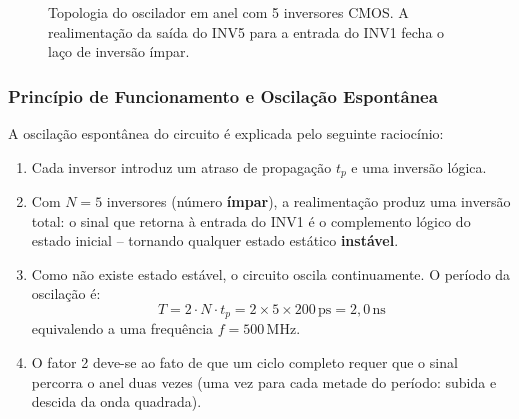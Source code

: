 \documentclass[12pt,a4paper]{article}
\begin{document}
\begin{figure}[H]
  \centering
  \caption{Topologia do oscilador em anel com 5 inversores CMOS. A realimentação
           da saída do INV5 para a entrada do INV1 fecha o laço de inversão ímpar.}
  \label{fig:ring_topo}
\end{figure}

\subsubsection{Princípio de Funcionamento e Oscilação Espontânea}

A oscilação espontânea do circuito é explicada pelo seguinte raciocínio:

\begin{destaquebox}
  \begin{enumerate}[leftmargin=1.2cm]
    \item Cada inversor introduz um atraso de propagação $t_p$ e uma inversão lógica.
    \item Com $N = 5$ inversores (número \textbf{ímpar}), a realimentação produz uma
          inversão total: o sinal que retorna à entrada do INV1 é o complemento lógico
          do estado inicial -- tornando qualquer estado estático \textbf{instável}.
    \item Como não existe estado estável, o circuito oscila continuamente. O período
          da oscilação é:
          \[
            T = 2 \cdot N \cdot t_p = 2 \times 5 \times 200\,\text{ps} = 2{,}0\,\text{ns}
          \]
          equivalendo a uma frequência $f = 500$\,MHz.
    \item O fator 2 deve-se ao fato de que um ciclo completo requer que o sinal
          percorra o anel duas vezes (uma vez para cada metade do período: subida
          e descida da onda quadrada).
  \end{enumerate}
\end{destaquebox}
\end{document}
